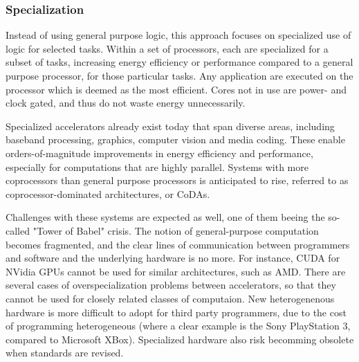 
\subsubsection{Specialization}
Instead of using general purpose logic, this approach focuses on specialized use of logic for selected tasks.
Within a set of processors, each are specialized for a subset of tasks, increasing energy efficiency or performance compared to a general purpose processor, for those particular tasks.
Any application are executed on the processor which is deemed as the most efficient.
Cores not in use are power- and clock gated, and thus do not waste energy unnecessarily.

Specialized accelerators already exist today that span diverse areas, including baseband processing, graphics, computer vision and media coding.
These enable orders-of-magnitude improvements in energy efficiency and performance, especially for computations that are highly parallel.
Systems with more coprocessors than general purpose processors is anticipated to rise, referred to as coprocessor-dominated architectures, or CoDAs.

Challenges with these systems are expected as well, one of them beeing the so-called "Tower of Babel" crisis.
The notion of general-purpose computation becomes fragmented, and the clear lines of communication between programmers and software and the underlying hardware is no more.
For instance, CUDA for NVidia GPUs cannot be used for similar architectures, such as AMD.
There are several cases of overspecialization problems between accelerators, so that they cannot be used for closely related classes of computaion.
New heterogenenous hardware is more difficult to adopt for third party programmers, due to the cost of programming heterogeneous (where a clear example is the Sony PlayStation 3, compared to Microsoft XBox). 
Specialized hardware also risk becomming obsolete when standards are revised. \cite{dark-silicon}




